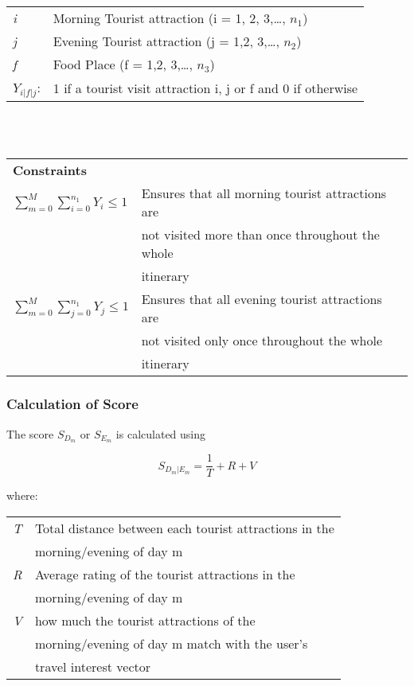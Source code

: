 \begin{tabular}{l l}

\textit{i} & Morning Tourist attraction (i = 1, 2, 3,…, $n_1$)\\
\textit{j} & Evening Tourist attraction (j = 1,2, 3,…, $n_2$)\\
\textit{f} & Food Place (f = 1,2, 3,…, $n_3$)\\
\textit{$Y_{i|f|j}$}: & 1 if a tourist visit attraction i, j or f and  0 if otherwise\\
\end{tabular}
\\ 
\\
\begin{tabular}{l l}
\textbf{Constraints} & \\
\textit{$ \sum_{m=0}^{M}\sum_{i=0}^{n_1}{Y_i} \leq 1$} & Ensures that all morning tourist attractions are \\ & not visited more than once throughout the whole \\ & itinerary\\

\textit{$ \sum_{m=0}^{M}\sum_{j=0}^{n_1}{Y_j} \leq 1$} & Ensures that all evening tourist attractions are \\ & not visited only once throughout the whole \\ & itinerary\\


\end{tabular}

\subsubsection{Calculation of Score}

The score $S_{D_m}$ or $S_{E_m}$ is calculated using

\[ S_{D_m | E_m} = \frac{1}{T} + R + V\]

where:
\\
\begin{tabular}{l l}
\textit{T} & Total distance between each tourist attractions in the \\ & morning/evening of day m\\ 
\textit{R} & Average rating of the tourist attractions in the \\ & morning/evening of day m \\  
\textit{V} & how much the tourist attractions of the \\ & morning/evening of day m match with the user's \\ & travel interest vector \\  

\end{tabular}
\\
\\
